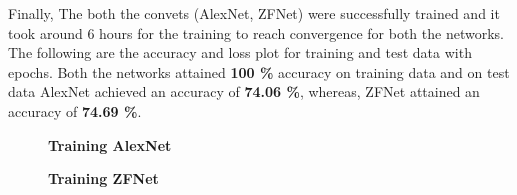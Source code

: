 \documentclass{article} %
\begin{document}
	Finally, The both the convets (AlexNet, ZFNet) were successfully trained and it took around 6 hours for the training to reach convergence for both the networks. The following are the accuracy and loss plot for training and test data with epochs. Both the networks attained \textbf{100 \%} accuracy on training data and on test data AlexNet achieved an accuracy of \textbf{74.06 \%}, whereas, ZFNet attained an accuracy of \textbf{74.69 \%}.
	
	
	\begin{figure}[h]
		\centering
		\caption{\textbf{Training AlexNet}}
	\end{figure}

	\begin{figure}[h]
		\centering
		\caption{\textbf{Training ZFNet}}
	\end{figure}


	\newpage	
\end{document}
